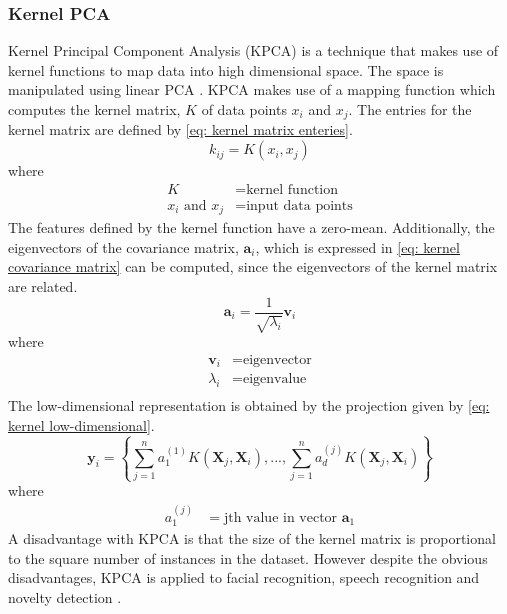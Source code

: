 \documentclass[11pt,twocolumn]{witseiepaper}
\begin{document}
	\subsubsection{Kernel PCA}
	Kernel Principal Component Analysis (KPCA) is a technique that makes use of kernel functions to map data into high dimensional space. The space is manipulated using linear PCA \cite{Cui2012}. KPCA makes use of a mapping function which computes the kernel matrix, $K$ of data points $x_i$ and $x_j$. The entries for the kernel matrix are defined by \eqref{eq: kernel matrix enteries}.
	\begin{equation}
		k_{ij} = K(x_i, x_j)
		\label{eq: kernel matrix enteries}
	\end{equation}
	where
	\begin{align*}
		K &= \text{kernel function}\\
		x_i \text{ and } x_j &= \text{input data points}
	\end{align*}
	The features defined by the kernel function have a zero-mean. Additionally, the eigenvectors of the covariance matrix, $\textbf{a}_i$, which is expressed in \eqref{eq: kernel covariance matrix} can be computed, since the eigenvectors of the kernel matrix are related. 
	\begin{equation}
		\textbf{a}_i = \frac{1}{\sqrt{\lambda_i}} \textbf{v}_i
		\label{eq: kernel covariance matrix}
	\end{equation}
	where
	\begin{align*}
		\textbf{v}_i &= \text{eigenvector} \\
		\lambda_i &= \text{eigenvalue}\\
	\end{align*}
	The low-dimensional representation is obtained by the projection given by \eqref{eq: kernel low-dimensional}.
	\begin{equation}
		\textbf{y}_i = \left\{ \sum_{j = 1}^{n}a_1^{(1)}K(\textbf{X}_j, \textbf{X}_i), ... , \sum_{j = 1}^{n}a_d^{(j)}K(\textbf{X}_j, \textbf{X}_i) \right\}
		\label{eq: kernel low-dimensional}
	\end{equation}
	where
	\begin{align*}
		a_1^{(j)} &= \text{jth value in vector }\textbf{a}_1
	\end{align*}
	A disadvantage with KPCA is that the size of the kernel matrix is proportional to the square number of instances in the dataset. However despite the obvious disadvantages, KPCA is applied to facial recognition, speech recognition and novelty detection \cite{van2009dimensionality}.
	
\end{document}
